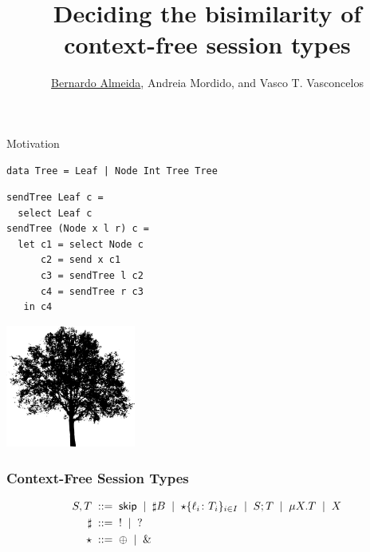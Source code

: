 \documentclass[10pt]{beamer}
\title[Deciding the bisimilarity of context-free session types]{Deciding the bisimilarity of context-free session types}
\date{
\vspace*{1cm}
\begin{center}
	March 2021
\end{center}}
\author[B.Almeida, A.Mordido, V.Vasconcelos]{\underline{Bernardo Almeida}, Andreia Mordido, and Vasco T. Vasconcelos}
\institute[LASIGE, Faculdade de Ci\^encias, ULisboa]{LASIGE, Faculdade de Ci\^encias, Universidade de Lisboa \\\\
}
\begin{document}
\lstset{language=Haskell}

\maketitle

\begin{frame}[fragile]{Motivation}
\vspace*{5mm}

\begin{lstlisting}[language=CFST]
data Tree = Leaf | Node Int Tree Tree
\end{lstlisting}

\begin{lstlisting}[language=CFST]
sendTree Leaf c =
  select Leaf c
sendTree (Node x l r) c =
  let c1 = select Node c
      c2 = send x c1
      c3 = sendTree l c2
      c4 = sendTree r c3
   in c4
\end{lstlisting}
  
\vspace*{-1.8cm}
\hfill \includegraphics[height=4cm]{img/tree}
\end{frame}

\begin{frame}
  \frametitle{Context-Free Session Types}
  \begin{align*}
  S,T &\; ::= \; \mathsf{skip} \;\mid\; \sharp B \;\mid\; 
  \star\{\ell_i\colon T_i\}_{i\in I} \;\mid\; S;T \;\mid\; \mu X.T \;\mid\; X
  \\
  \sharp &\; ::= \; {}! \;\mid\; {}? 
  \\
  \star  &\; ::= \; \oplus \;\mid\; {}\&
\end{align*}

\end{frame}


\end{document}
